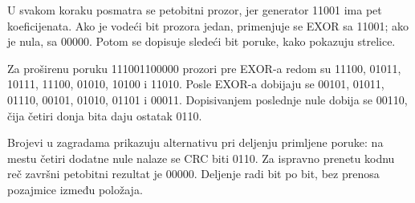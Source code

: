 U svakom koraku posmatra se petobitni prozor, jer generator 11001 ima pet koeficijenata. Ako je vodeći bit prozora jedan, primenjuje se EXOR sa 11001; ako je nula, sa 00000. Potom se dopisuje sledeći bit poruke, kako pokazuju strelice.

Za proširenu poruku 111001100000 prozori pre EXOR-a redom su 11100, 01011, 10111, 11100, 01010, 10100 i 11010. Posle EXOR-a dobijaju se 00101, 01011, 01110, 00101, 01010, 01101 i 00011. Dopisivanjem poslednje nule dobija se 00110, čija četiri donja bita daju ostatak 0110.

Brojevi u zagradama prikazuju alternativu pri deljenju primljene poruke: na mestu četiri dodatne nule nalaze se CRC biti 0110. Za ispravno prenetu kodnu reč završni petobitni rezultat je 00000. Deljenje radi bit po bit, bez prenosa pozajmice između položaja.
